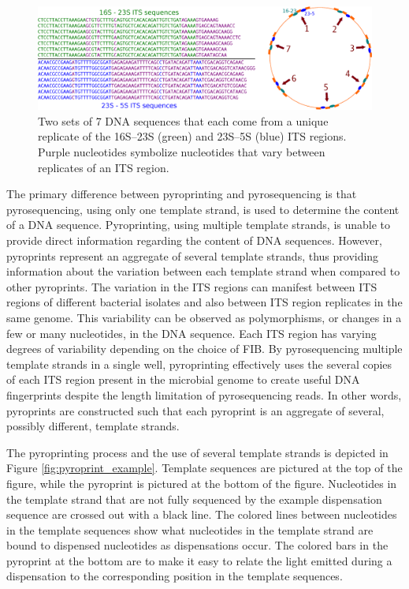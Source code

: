 \documentclass[12pt]{ucthesis}
\begin{document}
      \begin{figure}[t]
         \centering
         \includegraphics[width=\columnwidth]{graphics/sample_ITS_sequences.eps}
         \caption{Two sets of 7 DNA sequences that each come from a unique
                  replicate of the 16S--23S (green) and 23S--5S (blue) ITS
                  regions. Purple nucleotides symbolize nucleotides that vary
                  between replicates of an ITS region.}
         \label{fig:sample_ITS}
      \end{figure}

      The primary difference between pyroprinting and pyrosequencing is that
      pyrosequencing, using only one template strand, is used to determine the
      content of a DNA sequence. Pyroprinting, using multiple template
      strands, is unable to provide direct information regarding the content of
      DNA sequences. However, pyroprints represent an aggregate of several
      template strands, thus providing information about the variation between
      each template strand when compared to other pyroprints. The variation in
      the ITS regions can manifest between ITS regions of different bacterial
      isolates and also between ITS region replicates in the same genome. This
      variability can be observed as polymorphisms, or changes in a few or many
      nucleotides, in the DNA sequence. Each ITS region has varying degrees of
      variability depending on the choice of FIB. By pyrosequencing multiple
      template strands in a single well, pyroprinting effectively uses the
      several copies of each ITS region present in the microbial genome to
      create useful DNA fingerprints despite the length limitation of
      pyrosequencing reads. In other words, pyroprints are constructed such
      that each pyroprint is an aggregate of several, possibly different,
      template strands.

      The pyroprinting process and the use of several template strands is
      depicted in Figure \ref{fig:pyroprint_example}. Template sequences are
      pictured at the top of the figure, while the pyroprint is pictured at the
      bottom of the figure. Nucleotides in the template strand that are not
      fully sequenced by the example dispensation sequence are crossed out with
      a black line. The colored lines between nucleotides in the template
      sequences show what nucleotides in the template strand are bound to
      dispensed nucleotides as dispensations occur. The colored bars in the
      pyroprint at the bottom are to make it easy to relate the light emitted
      during a dispensation to the corresponding position in the template
      sequences.
\end{document}
